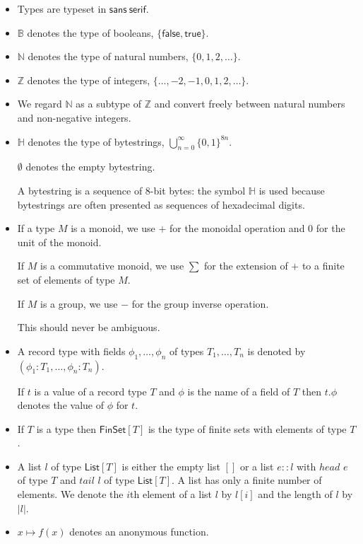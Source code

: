 \documentclass[a4paper]{article}
\newcounter{note}
\newcommand{\s}{\textsf}  %
\newcommand{\true}{\textsf{true}}
\newcommand{\false}{\textsf{false}}
\newcommand{\List}[1]{\ensuremath{\s{List}[#1]}}
\newcommand{\FinSet}[1]{\ensuremath{\s{FinSet}[#1]}}
\newcommand\B{\ensuremath{\mathbb{B}}}
\newcommand\N{\ensuremath{\mathbb{N}}}
\newcommand\Z{\ensuremath{\mathbb{Z}}}
\renewcommand\H{\ensuremath{\mathbb{H}}}
\newcommand{\emptyBs}{\ensuremath{\emptyset}}
\begin{document}
\begin{itemize}
\item Types are typeset in $\mathsf{sans~serif}$.

\item \B{} denotes the type of booleans, $\{\false, \true\}$.
\item \N{} denotes the type of natural numbers, $\{0, 1, 2, \ldots\}$.
\item \Z{} denotes the type of integers, $\{\ldots, -2, -1, 0, 1, 2, \ldots\}$.
\item We regard $\N$ as a subtype of $\Z$ and convert freely between
  natural numbers and non-negative integers.
\item \H{} denotes the type of bytestrings,
  $\bigcup_{n=0}^{\infty}\{0,1\}^{8n}$.

  \emptyBs{} denotes the empty bytestring.

  A bytestring is a sequence of 8-bit bytes: the symbol $\H$ is used because bytestrings are often
  presented as sequences of hexadecimal digits.

\item If a type $M$ is a monoid, we use $+$ for the monoidal operation and $0$
  for the unit of the monoid.

  If $M$ is a commutative monoid, we use $\sum$ for the extension of $+$ to a finite set of elements of
  type $M$.

  If $M$ is a group, we use $-$ for the group
  inverse operation.

  This should never be ambiguous.

\item A record type with fields $\phi_1, \ldots, \phi_n$ of types $T_1,
  \ldots, T_n$ is denoted by $(\phi_1 : T_1, \ldots, \phi_n : T_n)$.

  If $t$ is a value of a record type $T$ and $\phi$ is the name
  of a field of $T$ then $t.\phi$ denotes the value of $\phi$ for
  $t$.

\item If $T$ is a type then $\FinSet{T}$ is the type of finite sets
  with elements of type $T$.

\item A list $l$ of type $\List{T}$ is either the empty list
  $[]$ or a list $e :: l$ with $head$ $e$ of type $T$ and
  $tail$ $l$ of type $\List{T}$. A list has only a finite
  number of elements.  We denote the $i$th element of a list $l$ by
  $l[i]$ and the length of $l$ by $\left|l\right|$.

\item $x \mapsto f(x)$ denotes an anonymous function.


\end{itemize}
\end{document}
